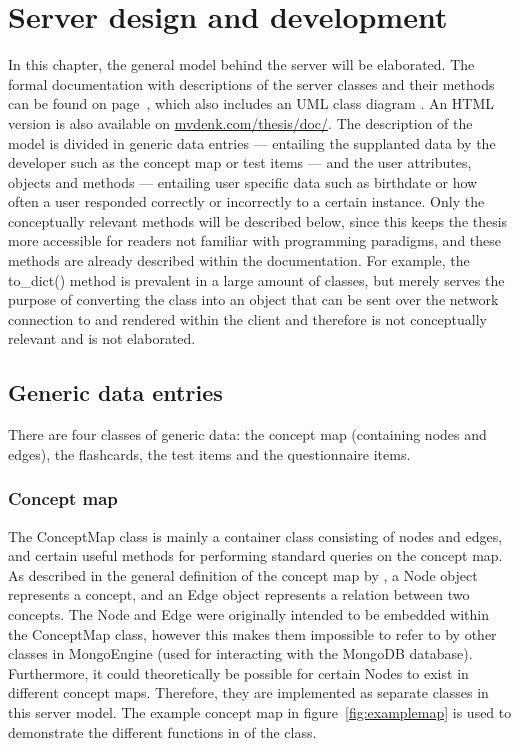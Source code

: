 \chapter{Server design and development}
\label{ch:server}

In this chapter, the general model behind the server will be elaborated. The formal documentation with descriptions of the server classes and their methods can be found on page~\pageref{app:documentation}, which also includes an UML class diagram \cite{uml}. An HTML version is also available on \url{mvdenk.com/thesis/doc/}. The description of the model is divided in generic data entries --- entailing the supplanted data by the developer such as the concept map or test items --- and the user attributes, objects and methods --- entailing user specific data such as birthdate or how often a user responded correctly or incorrectly to a certain instance. Only the conceptually relevant methods will be described below, since this keeps the thesis more accessible for readers not familiar with programming paradigms, and these methods are already described within the documentation. For example, the to\_dict() method is prevalent in a large amount of classes, but merely serves the purpose of converting the class into an object that can be sent over the network connection to and rendered within the client and therefore is not conceptually relevant and is not elaborated.

\section{Generic data entries}

There are four classes of generic data: the concept map (containing nodes and edges), the flashcards, the test items and the questionnaire items.

\subsection{Concept map}

The ConceptMap class is mainly a container class consisting of nodes and edges, and certain useful methods for performing standard queries on the concept map. As described in the general definition of the concept map by , a Node object represents a concept, and an Edge object represents a relation between two concepts. The Node and Edge were originally intended to be embedded within the ConceptMap class, however this makes them impossible to refer to by other classes in MongoEngine (used for interacting with the MongoDB database). Furthermore, it could theoretically be possible for certain Nodes to exist in different concept maps. Therefore, they are implemented as separate classes in this server model. The example concept map in figure~\ref{fig:examplemap} is used to demonstrate the different functions in of the class.

